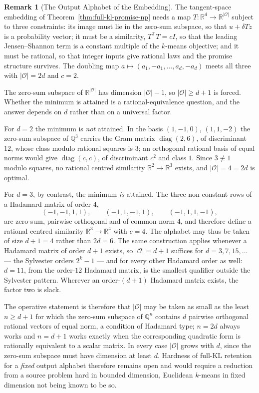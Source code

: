 \documentclass[12pt]{article}
\theoremstyle{definition}
\newtheorem{remark}[theorem]{Remark}
\begin{document}
\begin{remark}[The Output Alphabet of the Embedding]
\label{rem:output-alphabet-2d}
The tangent-space embedding of Theorem~\ref{thm:full-kl-promise-np} needs a map
$T:\mathbb R^{d}\to\mathbb R^{|\mathcal O|}$ subject to three constraints: its
image must lie in the zero-sum subspace, so that $u+\delta Tz$ is a probability
vector; it must be a similarity, $T^{\!\top}T=cI$, so that the leading
Jensen--Shannon term is a constant multiple of the $k$-means objective; and it
must be rational, so that integer inputs give rational laws and the promise
structure survives.  The doubling map
$a\mapsto(a_1,-a_1,\dots,a_d,-a_d)$ meets all three with $|\mathcal O|=2d$ and
$c=2$.

The zero-sum subspace of $\mathbb R^{|\mathcal O|}$ has dimension
$|\mathcal O|-1$, so $|\mathcal O|\ge d+1$ is forced.  Whether the minimum is
attained is a rational-equivalence question, and the answer depends on $d$
rather than on a universal factor.

For $d=2$ the minimum is \emph{not} attained.  In the basis $(1,-1,0)$,
$(1,1,-2)$ the zero-sum subspace of $\mathbb Q^{3}$ carries the Gram matrix
$\operatorname{diag}(2,6)$, of discriminant $12$, whose class modulo rational
squares is $3$; an orthogonal rational basis of equal norms would give
$\operatorname{diag}(c,c)$, of discriminant $c^{2}$ and class $1$.  Since
$3\not\equiv1$ modulo squares, no rational centred similarity
$\mathbb R^{2}\to\mathbb R^{3}$ exists, and $|\mathcal O|=4=2d$ is optimal.

For $d=3$, by contrast, the minimum \emph{is} attained.  The three non-constant
rows of a Hadamard matrix of order $4$,
\[
(-1,-1,1,1),\qquad(-1,1,-1,1),\qquad(-1,1,1,-1),
\]
are zero-sum, pairwise orthogonal and of common norm $4$, and therefore define
a rational centred similarity $\mathbb R^{3}\to\mathbb R^{4}$ with $c=4$.  The
alphabet may thus be taken of size $d+1=4$ rather than $2d=6$.  The same
construction applies whenever a Hadamard matrix of order $d+1$ exists, so
$|\mathcal O|=d+1$ suffices for $d=3,7,15,\dots$ --- the Sylvester orders
$2^{k}-1$ --- and for every other Hadamard order as well: $d=11$, from the
order-$12$ Hadamard matrix, is the smallest qualifier outside the Sylvester
pattern.  Wherever an order-$(d+1)$ Hadamard matrix exists, the factor two is
slack.

The operative statement is therefore that $|\mathcal O|$ may be taken as small
as the least $n\ge d+1$ for which the zero-sum subspace of $\mathbb Q^{n}$
contains $d$ pairwise orthogonal rational vectors of equal norm, a condition of
Hadamard type; $n=2d$ always works and $n=d+1$ works exactly when the
corresponding quadratic form is rationally equivalent to a scalar matrix.  In
every case $|\mathcal O|$ grows with $d$, since the zero-sum subspace must have
dimension at least $d$.  Hardness of full-KL retention for a \emph{fixed}
output alphabet therefore remains open and would require a reduction from a
source problem hard in bounded dimension, Euclidean $k$-means in fixed
dimension not being known to be so.
\end{remark}
\end{document}
